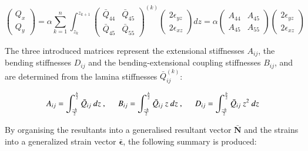 \begin{equation} 
			\begin{pmatrix}
			Q_{x} \\
			Q_{y} 
			\end{pmatrix}
		= \alpha
		\sum_{k=1}^n
		\int_{z_k}^{z_{k+1}}
			{\begin{pmatrix}
			\bar{Q}_{44} & \bar{Q}_{45} \\
			\bar{Q}_{45} & \bar{Q}_{55} 
			\end{pmatrix}}^{(k)}
			\begin{pmatrix}
			2\epsilon_{yz} \\
			2\epsilon_{xz} 
			\end{pmatrix}
		dz
		= \alpha
			{\begin{pmatrix}
			{A}_{44} & {A}_{45} \\
			{A}_{45} & {A}_{55} 
			\end{pmatrix}}
			\begin{pmatrix}
			2\epsilon_{yz} \\
			2\epsilon_{xz} 
			\end{pmatrix}
		\label{eqscomp_laminate_constitutive5}
\end{equation}

The three introduced matrices represent the extensional stiffnesses $A_{ij}$, the bending stiffnesses $D_{ij}$ and the bending-extensional coupling stiffnesses $B_{ij}$, and are determined from the lamina stiffnesses $\bar{Q}_{ij}^{(k)}$:

\begin{equation} 
	A_{ij} = 
	\int_{\frac{-h}{2}}^{\frac{h}{2}}
	\bar{Q}_{ij}
	\ dz\ ,
	\hspace{5mm}
	B_{ij} = 
	\int_{\frac{-h}{2}}^{\frac{h}{2}}
	\bar{Q}_{ij}\ z
	\ dz\ ,
	\hspace{5mm}
	D_{ij} = 
	\int_{\frac{-h}{2}}^{\frac{h}{2}}
	\bar{Q}_{ij}\ z^2
	\ dz
	\label{eqscomp_laminate_constitutive6}
\end{equation}

By organising the resultants into a generalised resultant vector $\bar{\mathbf{N}}$ and the strains into a generalized strain vector $\bar{\boldsymbol{\epsilon}}$, the following summary is produced:

